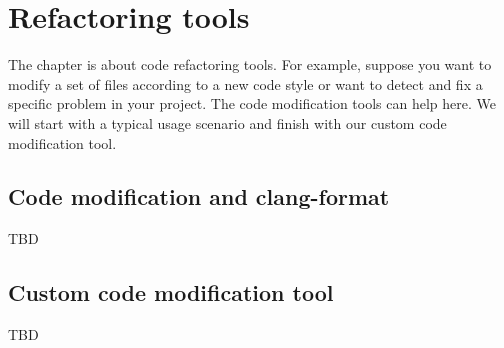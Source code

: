 \chapter{Refactoring tools}
 The chapter is about code refactoring tools. For example, suppose you want to
 modify a set of files according to a new code style or want to detect and fix a
 specific problem in your project. The code modification tools can help here. We
 will start with a typical usage scenario and finish with our custom code
 modification tool. 

\section{Code modification and clang-format}
TBD

\section{Custom code modification tool}
TBD
